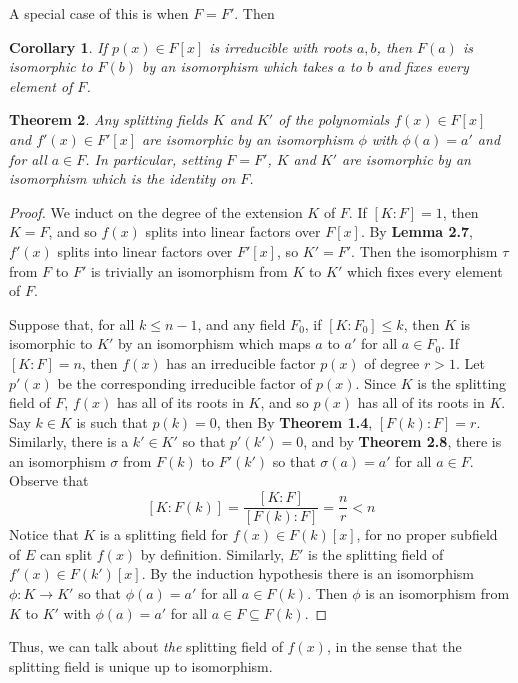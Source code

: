 \documentclass[12pt,leqno]{article}
\numberwithin{equation}{section}
\theoremstyle{plain}
\newtheorem{thm}{Theorem}[section]
\newtheorem{cor}[thm]{Corollary}
\theoremstyle{definition}
\theoremstyle{remark}
\begin{document}
A special case of this is when $F=F'$. Then

\begin{cor}
 If $p(x)\in F[x]$ is irreducible with roots $a,b$, then $F(a)$ is isomorphic to $F(b)$ by an isomorphism which takes $a$ to $b$ and fixes every element of $F$.
\end{cor}

\begin{thm}
 Any splitting fields $K$ and $K'$ of the polynomials $f(x)\in F[x]$ and $f'(x)\in F'[x]$ are isomorphic by an isomorphism $\phi$ with $\phi(a)=a'$ and for all $a\in F$. In particular, setting $F=F'$, $K$ and $K'$ are isomorphic by an isomorphism which is the identity on $F$.
\end{thm}

\begin{proof}
 We induct on the degree of the extension $K$ of $F$. If $[K:F]=1$, then $K=F$, and so $f(x)$ splits into linear factors over $F[x]$. By \textbf{Lemma 2.7}, $f'(x)$ splits into linear factors over $F'[x]$, so $K'=F'$. Then the isomorphism $\tau$ from $F$ to $F'$ is trivially an isomorphism from $K$ to $K'$ which fixes every element of $F$.

Suppose that, for all $k\leq n-1$, and any field $F_0$, if $[K:F_0]\leq k$, then $K$ is isomorphic to $K'$ by an isomorphism which maps $a$ to $a'$ for all $a\in F_0$. If $[K:F]=n$, then $f(x)$ has an irreducible factor $p(x)$ of degree $r>1$. Let $p'(x)$ be the corresponding irreducible factor of $p(x)$. Since $K$ is the splitting field of $F$, $f(x)$ has all of its roots in $K$, and so $p(x)$ has all of its roots in $K$. Say $k\in K$ is such that $p(k)=0$, then By \textbf{Theorem 1.4}, $[F(k):F]=r$. Similarly, there is a $k'\in K'$ so that $p'(k')=0$, and by \textbf{Theorem 2.8}, there is an isomorphism $\sigma$ from $F(k)$ to $F'(k')$ so that $\sigma(a)=a'$ for all $a\in F$. Observe that\[[K:F(k)]=\frac{[K:F]}{[F(k):F]}=\frac{n}{r}<n\] Notice that $K$ is a splitting field for $f(x)\in F(k)[x]$, for no proper subfield of $E$ can split $f(x)$ by definition. Similarly, $E'$ is the splitting field of $f'(x)\in F(k')[x]$. By the induction hypothesis there is an isomorphism $\phi:K\to K'$ so that $\phi(a)=a'$ for all $a\in F(k)$. Then $\phi$ is an isomorphism from $K$ to $K'$ with $\phi(a)=a'$ for all $a\in F\subseteq F(k)$.
\end{proof}

Thus, we can talk about \textit{the} splitting field of $f(x)$, in the sense that the splitting field is unique up to isomorphism. 
\end{document}
